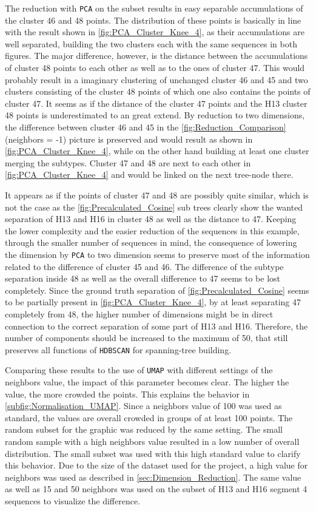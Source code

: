 The reduction with \texttt{PCA} on the subset results in easy separable accumulations of the cluster 46 and 48 points. The distribution of these points is basically in line with the result shown in \autoref{fig:PCA_Cluster_Knee_4}, as their accumulations are well separated, building the two clusters each with the same sequences in both figures. The major difference, however, is the distance between the accumulations of cluster 48 points to each other as well as to the ones of cluster 47. This would probably result in a imaginary clustering of unchanged cluster 46 and 45 and two clusters consisting of the cluster 48 points of which one also contains the points of cluster 47. It seems as if the distance of the cluster 47 points and the H13 cluster 48 points is underestimated to an great extend. By reduction to two dimensions, the difference between cluster 46 and 45 in the \autoref{fig:Reduction_Comparison} (neighbors = -1) picture is preserved and would result as shown in \autoref{fig:PCA_Cluster_Knee_4}, while on the other hand building at least one cluster merging the subtypes. Cluster 47 and 48 are next to each other in \autoref{fig:PCA_Cluster_Knee_4} and would be linked on the next tree-node there.

It appears as if the points of cluster 47 and 48 are possibly quite similar, which is not the case as the \autoref{fig:Precalculated_Cosine} sub trees clearly show the wanted separation of H13 and H16 in cluster 48 as well as the distance to 47. Keeping the lower complexity and the easier reduction of the sequences in this example, through the smaller number of sequences in mind, the consequence of lowering the dimension by \texttt{PCA} to two dimension seems to preserve most of the information related to the difference of cluster 45 and 46. The difference of the subtype separation inside 48 as well as the overall difference to 47 seems to be lost completely. Since the ground truth separation of \autoref{fig:Precalculated_Cosine} seems to be partially present in \autoref{fig:PCA_Cluster_Knee_4}, by at least separating 47 completely from 48, the higher number of dimensions might be in direct connection to the correct separation of some part of H13 and H16. Therefore, the number of components should be increased to the maximum of 50, that still preserves all functions of \texttt{HDBSCAN} for spanning-tree building. 

Comparing these results to the use of \texttt{UMAP} with different settings of the neighbors value, the impact of this parameter becomes clear. The higher the value, the more crowded the points. This explains the behavior in \autoref{subfig:Normalisation_UMAP}. Since a neighbors value of 100 was used as standard, the values are overall crowded in groups of at least 100 points. The random subset for the graphic was reduced by the same setting. The small random sample with a high neighbors value resulted in a low number of overall distribution. The small subset was used with this high standard value to clarify this behavior. Due to the size of the dataset used for the project, a high value for neighbors was used as described in \autoref{sec:Dimension_Reduction}. The same value as well as 15 and 50 neighbors was used on the subset of H13 and H16 segment 4 sequences to visualize the difference. 

